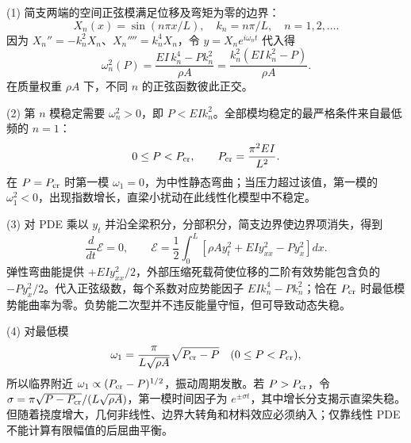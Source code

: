 (1) 简支两端的空间正弦模满足位移及弯矩为零的边界：
\[
X_n(x)=\sin(n\pi x/L),\quad k_n=n\pi/L,\quad n=1,2,\dots.
\]
因为 \(X_n''=-k_n^2X_n\)、\(X_n''''=k_n^4X_n\)，令 \(y=X_n e^{i\omega_nt}\) 代入得
\[
\omega_n^2(P)=\frac{EI\,k_n^4-Pk_n^2}{\rho A}
=\frac{k_n^2(EI\,k_n^2-P)}{\rho A}.
\]
在质量权重 \(\rho A\) 下，不同 \(n\) 的正弦函数彼此正交。

(2) 第 \(n\) 模稳定需要 \(\omega_n^2>0\)，即 \(P<EI k_n^2\)。全部模均稳定的最严格条件来自最低频的 \(n=1\)：
\[
0\le P<P_{\rm cr},\qquad P_{\rm cr}=\frac{\pi^2EI}{L^2}.
\]
在 \(P=P_{\rm cr}\) 时第一模 \(\omega_1=0\)，为中性静态弯曲；当压力超过该值，第一模的 \(\omega_1^2<0\)，出现指数增长，直梁小扰动在此线性化模型中不稳定。

(3) 对 PDE 乘以 \(y_t\) 并沿全梁积分，分部积分，简支边界使边界项消失，得到
\[
\frac{d}{dt}\mathcal E=0,\qquad
\mathcal E=\frac12\int_0^L\left[\rho A y_t^2+EI y_{xx}^2-P y_x^2\right]dx.
\]
弹性弯曲能提供 \(+EI y_{xx}^2/2\)，外部压缩死载荷使位移的二阶有效势能包含负的 \(-P y_x^2/2\)。代入正弦级数，每个系数对应势能因子 \(EI k_n^4-Pk_n^2\)；恰在 \(P_{\rm cr}\) 时最低模势能曲率为零。负势能二次型并不违反能量守恒，但可导致动态失稳。

(4) 对最低模
\[
\omega_1=\frac{\pi}{L\sqrt{\rho A}}\sqrt{P_{\rm cr}-P}
\quad (0\le P<P_{\rm cr}),
\]
所以临界附近 \(\omega_1\propto(P_{\rm cr}-P)^{1/2}\)，振动周期发散。若 \(P>P_{\rm cr}\)，令 \(\sigma=\pi\sqrt{P-P_{\rm cr}}/(L\sqrt{\rho A})\)，第一模时间因子为 \(e^{\pm\sigma t}\)，其中增长分支揭示直梁失稳。但随着挠度增大，几何非线性、边界大转角和材料效应必须纳入；仅靠线性 PDE 不能计算有限幅值的后屈曲平衡。
